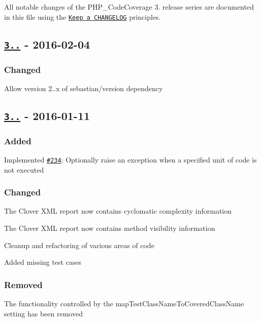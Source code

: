 All notable changes of the P\+H\+P\+\_\+\+Code\+Coverage 3. release series are documented in this file using the \href{http://keepachangelog.com/}{\tt Keep a C\+H\+A\+N\+G\+E\+L\+OG} principles.

\subsection*{\href{https://github.com/sebastianbergmann/php-code-coverage/compare/3.1.0...3.1.1}{\tt 3..} -\/ 2016-\/02-\/04}

\subsubsection*{Changed}


\begin{DoxyItemize}
\item Allow version 2..\+x of {\ttfamily sebastian/version} dependency
\end{DoxyItemize}

\subsection*{\href{https://github.com/sebastianbergmann/php-code-coverage/compare/3.0...3.1.0}{\tt 3..} -\/ 2016-\/01-\/11}

\subsubsection*{Added}


\begin{DoxyItemize}
\item Implemented \href{https://github.com/sebastianbergmann/php-code-coverage/issues/234}{\tt \#234}\+: Optionally raise an exception when a specified unit of code is not executed
\end{DoxyItemize}

\subsubsection*{Changed}


\begin{DoxyItemize}
\item The Clover X\+ML report now contains cyclomatic complexity information
\item The Clover X\+ML report now contains method visibility information
\item Cleanup and refactoring of various areas of code
\item Added missing test cases
\end{DoxyItemize}

\subsubsection*{Removed}


\begin{DoxyItemize}
\item The functionality controlled by the {\ttfamily map\+Test\+Class\+Name\+To\+Covered\+Class\+Name} setting has been removed 
\end{DoxyItemize}